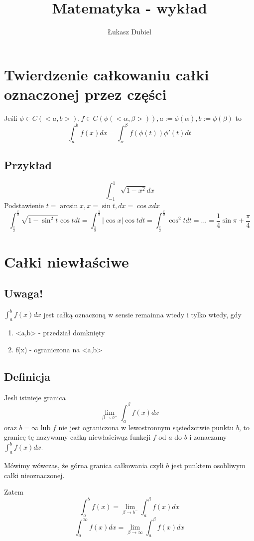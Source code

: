 \documentclass[11pt]{article}
\author{Łukasz Dubiel}
\title{Matematyka - wykład}
\begin{document}
\maketitle

\section{Twierdzenie całkowaniu całki oznaczonej przez części}
Jeśli $\phi \in C(<a,b>) , f \in C( \phi (<\alpha,\beta>)), a:= \phi(\alpha), b:=\phi(\beta)$ to 
$$\int_a^b f(x)dx = \int_\alpha^\beta f(\phi(t))\phi'(t)dt$$
\subsection{Przykład}
$$\int_{-1}^{1} \sqrt{1-x^2}dx $$
Podstawienie $ t = \arcsin{x} , x = \sin{t} , dx = \cos{x}dx $ 
$$\int_{\frac{\pi}{2}}^{\frac{\pi}{2}} \sqrt{1-\sin^2{t}}\cos{t}dt = \int_{\frac{\pi}{2}}^{\frac{\pi}{2}} |\cos{x}|\cos{t}dt = \int_{\frac{\pi}{2}}^{\frac{\pi}{2}}\cos^2{t}dt = ... = \frac{1}{4}\sin{\pi} + \frac{\pi}{4} $$

\section{Całki niewłaściwe}
\subsection{Uwaga!}
$\int_a^b f(x)dx$ jest całką oznaczoną w sensie remainna wtedy i tylko wtedy, gdy
\begin{enumerate}
\item{<a,b> - przedział domknięty}
\item{f(x) - ograniczona na <a,b>}
\end{enumerate}
\subsection{Definicja}
Jesli istnieje granica $$\lim_{\beta \to b^-}{\int_a^{\beta} f(x)dx}$$ oraz $b = \infty$ lub $f$ nie jest ograniczona w lewostronnym sąsiedzctwie punktu $b$, to granicę tę nazywamy całką niewłaściwąz funkcji $f$ od $a $ do $b$ i zonaczamy $\int_a^b f(x)dx$.

Mówimy wówczas, że górna granica całkowania czyli $b$ jest punktem osobliwym całki nieoznaczonej.

Zatem
$$\int_a^b f(x) = \lim_{\beta \to b^-}{\int_a^{\beta} f(x)dx}$$
$$\int_a^{\infty}f(x)dx = \lim_{\beta \to \infty}{\int_a^{\beta}f(x)dx}$$
\end{document}
